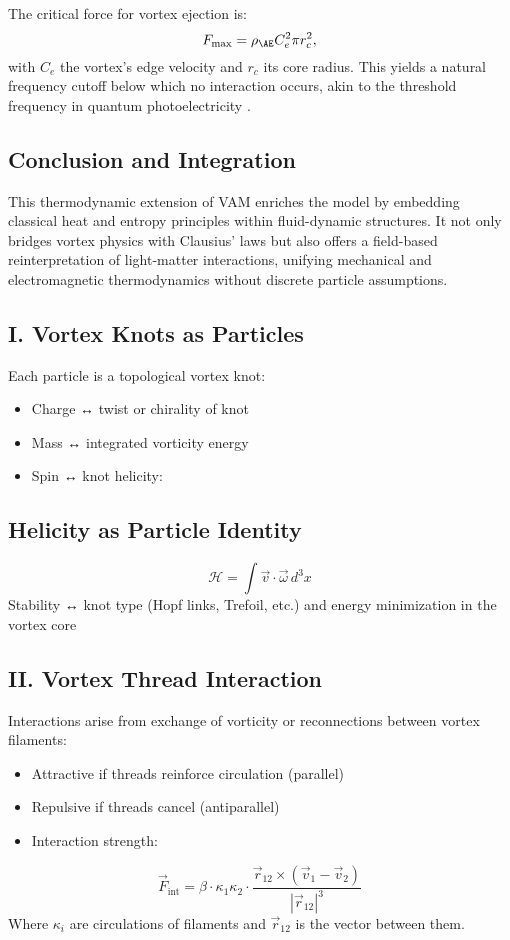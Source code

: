 The critical force for vortex ejection is:
\begin{equation}
F_{\text{max}} = \rho_{\AE} C_e^2 \pi r_c^2,
\end{equation}
with $C_e$ the vortex's edge velocity and $r_c$ its core radius. This yields a natural frequency cutoff below which no interaction occurs, akin to the threshold frequency in quantum photoelectricity \cite{einstein1905photoelectric}.

\subsection{Conclusion and Integration}

This thermodynamic extension of VAM enriches the model by embedding classical heat and entropy principles within fluid-dynamic structures. It not only bridges vortex physics with Clausius' laws but also offers a field-based reinterpretation of light-matter interactions, unifying mechanical and electromagnetic thermodynamics without discrete particle assumptions.






\subsection*{I. Vortex Knots as Particles}
Each particle is a topological vortex knot:
\begin{itemize}
    \item Charge ↔ twist or chirality of knot
    \item Mass ↔ integrated vorticity energy
    \item Spin ↔ knot helicity:
\end{itemize}
\subsection*{Helicity as Particle Identity}
\begin{equation}
    \mathcal{H} = \int \vec{v} \cdot \vec{\omega} \, d^3x
\end{equation}
Stability ↔ knot type (Hopf links, Trefoil, etc.) and energy minimization in the vortex core

\subsection*{II. Vortex Thread Interaction}
Interactions arise from exchange of vorticity or reconnections between vortex filaments:
\begin{itemize}
    \item Attractive if threads reinforce circulation (parallel)
    \item Repulsive if threads cancel (antiparallel)
    \item Interaction strength:
\end{itemize}
\begin{equation}
    \vec{F}_{\text{int}} = \beta \cdot \kappa_1 \kappa_2 \cdot \frac{\vec{r}_{12} \times (\vec{v}_1 - \vec{v}_2)}{|\vec{r}_{12}|^3}
\end{equation}
Where \(\kappa_i\) are circulations of filaments and \(\vec{r}_{12}\) is the vector between them.


